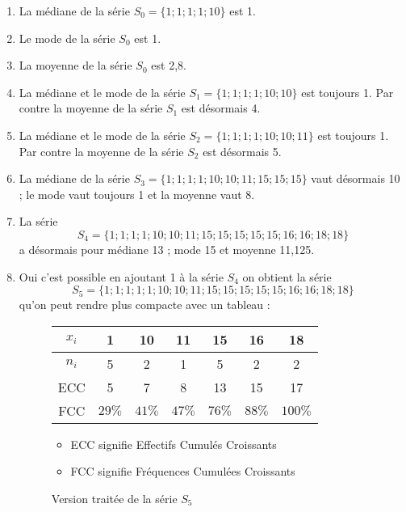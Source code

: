 \begin{enumerate}[label=C\arabic*)]
	\item La médiane de  la série $S_0 = \{1 ; 1 ; 1 ; 1 ; 10\}$ est 1.
	\item Le mode de  la série $S_0$ est 1.
	\item La moyenne de  la série $S_0$ est 2,8.
	\item La médiane et le mode de la série $S_1 = \{1 ; 1 ; 1 ; 1 ; 10 ; 10\}$ est toujours 1. Par contre la moyenne de la série $S_1$ est désormais 4.
	\item La médiane et le mode de la série $S_2 = \{1 ; 1 ; 1 ; 1 ; 10 ; 10 ; 11\}$ est toujours 1. Par contre la moyenne de la série $S_2$ est désormais 5.
	\item La médiane de la série $S_3 = \{1 ; 1 ; 1 ; 1 ; 10 ; 10 ; 11 ; 15 ; 15 ; 15\}$ vaut désormais 10 ; le mode vaut toujours 1 et la moyenne vaut 8.
	\item La série \[S_4 = \{1 ; 1 ; 1 ; 1 ; 10 ; 10 ; 11 ; 15 ; 15 ; 15 ; 15 ; 15 ; 16 ; 16 ; 18 ; 18\}\] a désormais pour médiane 13 ; mode 15 et moyenne 11,125.
	\item Oui c'est possible en ajoutant 1 à la série $S_4$ on obtient la série \[S_5 = \{1 ; 1 ; 1 ; 1 ; 1 ; 10 ; 10 ; 11 ; 15 ; 15 ; 15 ; 15 ; 15 ; 16 ; 16 ; 18 ; 18\}\] qu'on peut rendre plus compacte avec un tableau :
	\begin{center}
		\begin{figure}[H]
		\caption{Version traitée de la série $S_5$}
		\centering
		\vspace{.5cm}
		\begin{tabular}{*{7}{|c}|}
			\hline
			$x_i$ & 1 & 10 & 11 & 15 & 16 & 18 \\
			\hline
			$n_i$ & 5 & 2 & 1 & 5 & 2 & 2 \\
			\hline
			ECC & 5 & 7 & 8 & 13 & 15 & 17\\
			\hline
			FCC & $29\%$ & $41\%$ & $47\%$ & $76\%$ & $88\%$ & $100\%$  \\
			\hline
		\end{tabular}
			\vspace{.5cm}
			\begin{itemize}
				\item ECC signifie Effectifs Cumulés Croissants
				\item FCC signifie Fréquences Cumulées Croissants
			\end{itemize}
		\end{figure}
	\end{center}
	

\end{enumerate}

